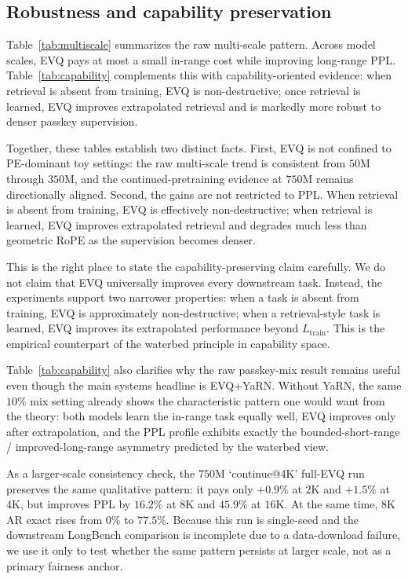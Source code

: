 \subsection{Robustness and capability preservation}

Table~\ref{tab:multiscale} summarizes the raw multi-scale pattern. Across model scales, EVQ pays at most a small in-range cost while improving long-range PPL. Table~\ref{tab:capability} complements this with capability-oriented evidence: when retrieval is absent from training, EVQ is non-destructive; once retrieval is learned, EVQ improves extrapolated retrieval and is markedly more robust to denser passkey supervision.




Together, these tables establish two distinct facts. First, EVQ is not confined to PE-dominant toy settings: the raw multi-scale trend is consistent from \(50\mathrm{M}\) through \(350\mathrm{M}\), and the continued-pretraining evidence at \(750\mathrm{M}\) remains directionally aligned. Second, the gains are not restricted to PPL. When retrieval is absent from training, EVQ is effectively non-destructive; when retrieval is learned, EVQ improves extrapolated retrieval and degrades much less than geometric RoPE as the supervision becomes denser.

This is the right place to state the capability-preserving claim carefully. We do not claim that EVQ universally improves every downstream task. Instead, the experiments support two narrower properties: when a task is absent from training, EVQ is approximately non-destructive; when a retrieval-style task is learned, EVQ improves its extrapolated performance beyond \(L_{\mathrm{train}}\). This is the empirical counterpart of the waterbed principle in capability space.

Table~\ref{tab:capability} also clarifies why the raw passkey-mix result remains useful even though the main systems headline is EVQ+YaRN. Without YaRN, the same \(10\%\) mix setting already shows the characteristic pattern one would want from the theory: both models learn the in-range task equally well, EVQ improves only after extrapolation, and the PPL profile exhibits exactly the bounded-short-range / improved-long-range asymmetry predicted by the waterbed view.



As a larger-scale consistency check, the \(750\mathrm{M}\) `continue@4K' full-EVQ run preserves the same qualitative pattern: it pays only \(+0.9\%\) at \(2\mathrm{K}\) and \(+1.5\%\) at \(4\mathrm{K}\), but improves PPL by \(16.2\%\) at \(8\mathrm{K}\) and \(45.9\%\) at \(16\mathrm{K}\). At the same time, \(8\mathrm{K}\) AR exact rises from \(0\%\) to \(77.5\%\). Because this run is single-seed and the downstream LongBench comparison is incomplete due to a data-download failure, we use it only to test whether the same pattern persists at larger scale, not as a primary fairness anchor.

